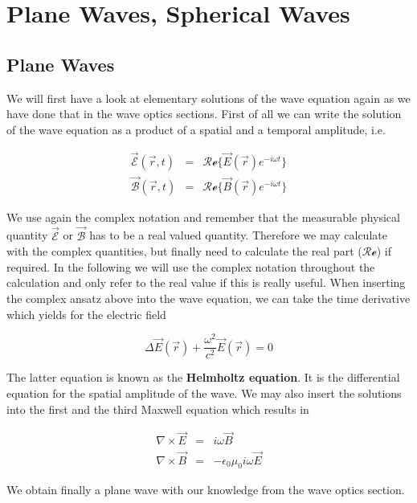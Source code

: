 \documentclass[
  a4paper,
]{book}
\begin{document}
\section{Plane Waves, Spherical
Waves}\label{plane-waves-spherical-waves}

\subsection{Plane Waves}\label{plane-waves-1}

We will first have a look at elementary solutions of the wave equation
again as we have done that in the wave optics sections. First of all we
can write the solution of the wave equation as a product of a spatial
and a temporal amplitude, i.e.

\begin{eqnarray}
\vec{\mathcal{E}}(\vec{r},t)&=&\mathcal{Re}\lbrace \vec{E}(\vec{r})e^{-i\omega t}\rbrace\\
\vec{\mathcal{B}}(\vec{r},t)&=&\mathcal{Re}\lbrace \vec{B}(\vec{r})e^{-i\omega t}\rbrace
\end{eqnarray}

We use again the complex notation and remember that the measurable
physical quantity \(\vec{\mathcal{E}}\) or \(\vec{\mathcal{B}}\) has to
be a real valued quantity. Therefore we may calculate with the complex
quantities, but finally need to calculate the real part
(\(\mathcal{Re}\)) if required. In the following we will use the complex
notation throughout the calculation and only refer to the real value if
this is really useful. When inserting the complex ansatz above into the
wave equation, we can take the time derivative which yields for the
electric field

\begin{equation}
\Delta \vec{E}(\vec{r})+\frac{\omega^2}{c^2}\vec{E}(\vec{r})=0
\tag{Helmholtz Equation}
\end{equation}

The latter equation is known as the \textbf{Helmholtz equation}. It is
the differential equation for the spatial amplitude of the wave. We may
also insert the solutions into the first and the third Maxwell equation
which results in

\begin{eqnarray}
\nabla \times \vec{E}&=&i\omega\vec{B}\\
\nabla \times\vec{B} &=& -\epsilon_0\mu_0 i\omega \vec{E}
\end{eqnarray}

We obtain finally a plane wave with our knowledge from the wave optics
section.
\end{document}
